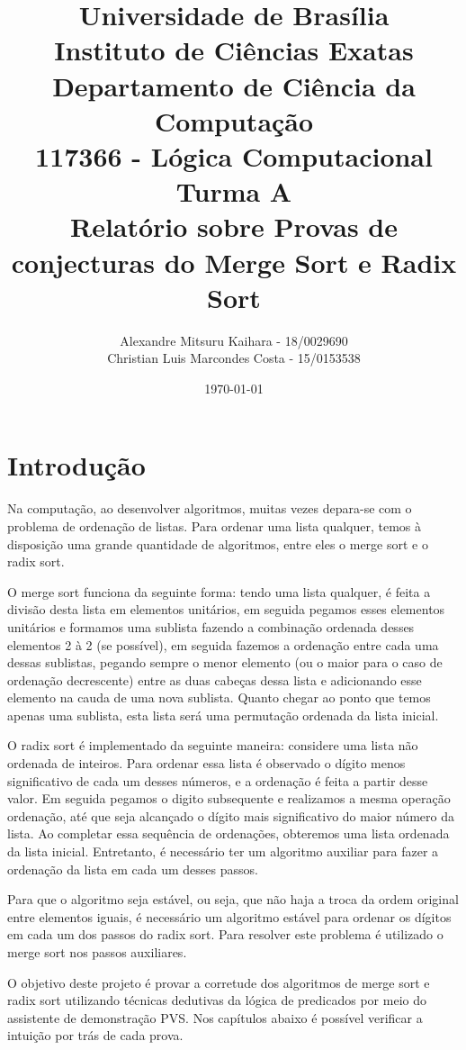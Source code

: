 \documentclass[12pt]{article}
\title{{\large Universidade de Brasília \\ Instituto de Ciências Exatas \\
Departamento de Ciência da Computação} \\[1cm]
117366 - Lógica Computacional Turma A\\[.5cm]
Relatório sobre {\bf Provas de conjecturas do Merge Sort e Radix Sort}}
\author{Alexandre Mitsuru Kaihara - 18/0029690 \\
        Christian Luis Marcondes Costa - 15/0153538}
\date{\today}
\begin{document}
 
	\maketitle
	
	\section{Introdução}
	    Na computação, ao desenvolver algoritmos, muitas vezes depara-se com o problema de ordenação de listas. Para ordenar uma lista qualquer, temos à disposição uma grande quantidade de algoritmos, entre eles o merge sort e o radix sort. 
	    
	    O merge sort funciona da seguinte forma: tendo uma lista qualquer, é feita a divisão desta lista em elementos unitários, em seguida pegamos esses elementos unitários e formamos uma sublista fazendo a combinação ordenada desses elementos 2 à 2 (se possível), em seguida fazemos a ordenação entre cada uma dessas sublistas, pegando sempre o menor elemento (ou o maior para o caso de ordenação decrescente) entre as duas cabeças dessa lista e adicionando esse elemento na cauda de uma nova sublista. Quanto chegar ao ponto que temos apenas uma sublista, esta lista será uma permutação ordenada da lista inicial.
	    
	    O radix sort é implementado da seguinte maneira: considere uma lista não ordenada de inteiros. Para ordenar essa lista é observado o dígito menos significativo de cada um desses números, e a ordenação é feita a partir desse valor. Em seguida pegamos o digito subsequente e realizamos a mesma operação ordenação, até que seja alcançado o dígito mais significativo do maior número da lista. Ao completar essa sequência de ordenações, obteremos uma lista ordenada da lista inicial. Entretanto, é necessário ter um algoritmo auxiliar para fazer a ordenação da lista em cada um desses passos. 
	    
	    Para que o algoritmo seja estável, ou seja, que não haja a troca da ordem original entre elementos iguais, é necessário um algoritmo estável para ordenar os dígitos em cada um dos passos do radix sort. Para resolver este problema é utilizado o merge sort nos passos auxiliares.
	    
	    O objetivo deste projeto é provar a corretude dos algoritmos de merge sort e radix sort utilizando técnicas dedutivas da lógica de predicados por meio do assistente de demonstração PVS. Nos capítulos abaixo é possível verificar a intuição por trás de cada prova.
	    
\end{document}
